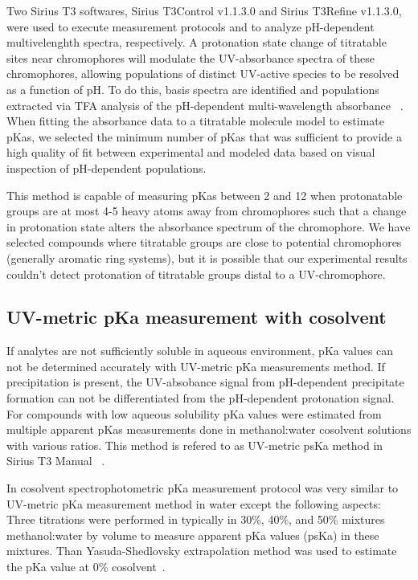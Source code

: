 \documentclass[9pt,lineno]{elife}
\begin{document}
Two Sirius T3 softwares, Sirius T3Control v1.1.3.0 and Sirius T3Refine v1.1.3.0, were used to execute measurement protocols and to analyze pH-dependent multivelenghth spectra, respectively.
A protonation state change of titratable sites near chromophores will modulate the UV-absorbance spectra of these chromophores, allowing populations of distinct UV-active species to be resolved as a function of pH. To do this, basis spectra are identified and populations extracted via TFA analysis of the pH-dependent multi-wavelength absorbance ~\citep{allen_multiwavelength_1998}. When fitting the absorbance data to a titratable molecule model to estimate pKas, we selected the minimum number of pKas that was sufficient to provide a high quality of fit between experimental and modeled data based on visual inspection of pH-dependent populations.

This method is capable of measuring pKas between 2 and 12 when protonatable groups are at most 4-5 heavy atoms away from chromophores such that a change in protonation state alters the absorbance spectrum of the chromophore. We have selected compounds where titratable groups are close to potential chromophores (generally aromatic ring systems), but it is possible that our experimental results couldn't detect protonation of titratable groups distal to a UV-chromophore.


\subsection{UV-metric pKa measurement with cosolvent}
If analytes are not sufficiently soluble in aqueous environment, pKa values can not be determined accurately with UV-metric pKa measurements method. If precipitation is present, the UV-absobance signal from pH-dependent precipitate formation can not be differentiated from the pH-dependent protonation signal. For compounds with low aqueous solubility pKa values were estimated from multiple apparent pKas measurements done in methanol:water cosolvent solutions with various ratios. This method is refered to as UV-metric psKa method in Sirius T3 Manual ~\citep{noauthor_sirius_2008}.

In cosolvent spectrophotometric pKa measurement protocol was very similar to UV-metric pKa measurement method in water except the following aspects: Three titrations were performed in typically in 30\%, 40\%, and 50\% mixtures methanol:water by volume to measure apparent pKa values (psKa) in these mixtures. Than Yasuda-Shedlovsky extrapolation method was used to estimate the pKa value at 0\% cosolvent~\citep{avdeef_ph-metric_1999,doi:10.1021/ac00049a010,TAKACSNOVAK1997235}. 
\end{document}
